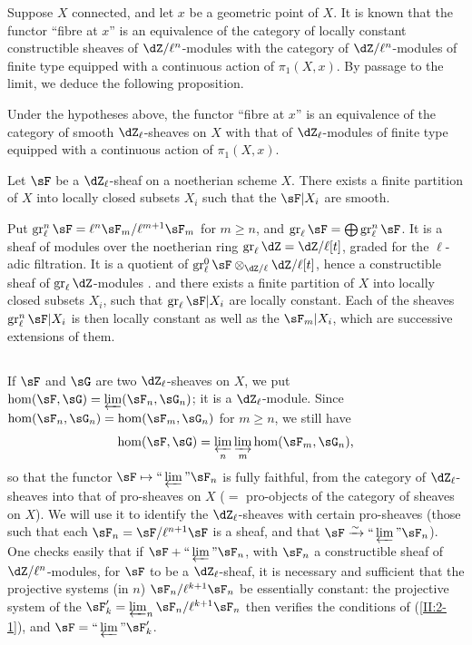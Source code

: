 Suppose $X$ connected, and let $x$ be a geometric point of $X$. It is known that
the functor ``fibre at $x$'' is an equivalence of the category of
locally constant constructible sheaves of $\dZ/\ell^n$-modules with the
category of $\dZ/\ell^n$-modules of finite type equipped with a continuous
action of $\pi_1(X,x)$. By passage to the limit, we deduce the following
proposition.




\begin{proposition_}\label{II:2-4}
Under the hypotheses above, the functor ``fibre at $x$'' is an
equivalence of the category of smooth $\dZ_\ell$-sheaves on $X$ with
that of $\dZ_\ell$-modules of finite type equipped with a continuous action of
$\pi_1(X,x)$.
\end{proposition_}




\begin{proposition_}\label{II:2-5}
Let $\sF$ be a $\dZ_\ell$-sheaf on a noetherian scheme $X$. There exists
a finite partition of $X$ into locally closed subsets $X_i$ such that
the $\sF|X_i$ are smooth.
\end{proposition_}

Put $\gr_\ell^n\sF=\ell^n\sF_m/\ell^{m+1}\sF_m$ for $m\geqslant n$, and
$\gr_\ell\sF=\bigoplus \gr_\ell^n\sF$. It is a sheaf of modules over
the noetherian ring $\gr_\ell\dZ=\dZ/\ell[t]$, graded for the
$\ell$-adic filtration. It is a quotient of
$\gr_\ell^0\sF \otimes_{\dZ/\ell} \dZ/\ell[t]$, hence a constructible sheaf of
$\gr_\ell\dZ$-modules \cite[IX.2]{sga4}. and there exists a finite partition
of $X$ into locally closed subsets $X_i$, such that
$\gr_\ell \sF|X_i$ are locally constant. Each of the sheaves
$\gr_\ell^n\sF|X_i$ is then locally constant as well as the $\sF_m|X_i$,
which are successive extensions of them.




\subsection{}\label{II:2-6}

If $\sF$ and $\sG$ are two $\dZ_\ell$-sheaves on $X$, we put
$\hom(\sF,\sG) = \varprojlim(\sF_n,\sG_n)$; it is a $\dZ_\ell$-module.
Since $\hom(\sF_n,\sG_n) = \hom(\sF_m,\sG_n)$ for $m\geqslant n$, we still have
\[
  \hom(\sF,\sG) = \varprojlim_n \varinjlim_m \hom(\sF_m,\sG_n) \text{,}
\]
so that the functor $\sF\mapsto \text{``}\varprojlim\text{''}\sF_n$ is
fully faithful, from the category of $\dZ_\ell$-sheaves into that of
pro-sheaves on $X$ ($=$ pro-objects of the category of sheaves on $X$).
We will use it to identify the $\dZ_\ell$-sheaves with certain
pro-sheaves (those such that each $\sF_n=\sF/\ell^{n+1}\sF$ is a sheaf,
and that $\sF\iso \text{``}\varprojlim\text{''}\sF_n$). One checks easily
that if $\sF+\text{``}\varprojlim\text{''}\sF_n$, with $\sF_n$ a
constructible sheaf of $\dZ/\ell^n$-modules, for $\sF$ to be a
$\dZ_\ell$-sheaf, it is necessary and sufficient that the projective systems (in $n$)
$\sF_n/\ell^{k+1}\sF_n$ be essentially constant: the projective
system of the $\sF_k'=\varprojlim_n\sF_n/\ell^{k+1}\sF_n$ then verifies the
conditions of (\ref{II:2-1}), and $\sF=\text{``}\varprojlim\text{''}\sF_k'$.

